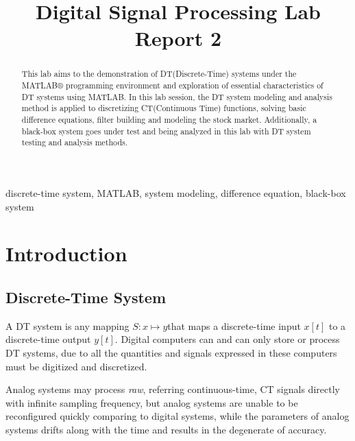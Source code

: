 \documentclass[conference]{IEEEtran}
\begin{document}
\title{Digital Signal Processing Lab Report 2}

\author{
}

\maketitle

\begin{abstract}
	This lab aims to the demonstration of DT(Discrete-Time) systems under the MATLAB\(\circledR \) programming environment and exploration of essential characteristics of DT systems using MATLAB. In this lab session, the DT system modeling and analysis method is applied to discretizing
	CT(Continuous Time) functions, solving basic difference equations, filter building and modeling the stock market. Additionally, a black-box system goes under test and being analyzed in this lab with DT system testing and analysis methods.
\end{abstract}

\begin{IEEEkeywords}
	discrete-time system, MATLAB, system modeling, difference equation, black-box system
\end{IEEEkeywords}

\section{Introduction}

\subsection{Discrete-Time System}

A DT system is any mapping \(S:x\mapsto y\)that maps a discrete-time input \(x[t]\) to a discrete-time output \(y[t]\). Digital computers can and can only store or process DT systems, due to all the quantities and signals expressed in these computers must be digitized and discretized.

Analog systems may process \textit{raw}, referring continuous-time, CT signals directly with infinite sampling frequency, but analog systems are unable to be reconfigured quickly comparing to digital systems, while the parameters of analog systems drifts along with the time and results in the degenerate of accuracy.
\end{document}
